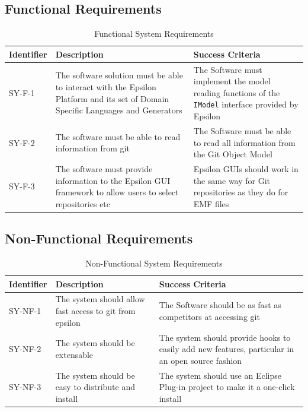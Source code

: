 \documentclass[11pt]{book}
\newcommand{\code}[1]{\texttt{#1}}
\begin{document}
\subsection{Functional Requirements}
\begin{table}[H]
\centering
\begin{longtable}{|p{2cm}|p{7cm}|p{6cm}|}
\hline
\textbf{Identifier} & \textbf{Description} & \textbf{Success Criteria} \\ \hline
SY-F-1 & The software solution must be able to interact with the Epsilon Platform and its set of Domain Specific Languages and Generators & The Software must implement the model reading functions of the \code{IModel} interface provided by Epsilon \\ \hline
SY-F-2 & The software must be able to read information from git & The Software must be able to read all information from the Git Object Model \\ \hline
SY-F-3 & The software must provide information to the Epsilon GUI framework to allow users to select repositories etc & Epsilon GUIs should work in the same way for Git repositories as they do for EMF files \\ \hline
\end{longtable}
\caption{Functional System Requirements}
\label{tab:functionalsystemrequirements}
\end{table}


\subsection{Non-Functional Requirements}
\begin{table}[H]
\centering
\begin{longtable}{|p{2cm}|p{7cm}|p{6cm}|}
\hline
\textbf{Identifier} & \textbf{Description} & \textbf{Success Criteria} \\ \hline
SY-NF-1 & The system should allow fast access to git from epsilon & The Software should be as fast as competitors at accessing git \\ \hline
SY-NF-2 & The system should be extensable & The system should provide hooks to easily add new features, particular in an open source fashion \\ \hline
SY-NF-3 & The system should be easy to distribute and install & The system should use an Eclipse Plug-in project to make it a one-click install \\ \hline
\end{longtable}
\caption{Non-Functional System Requirements}
\label{tab:nonfunctionalsystemrequirements}
\end{table}
\end{document}
